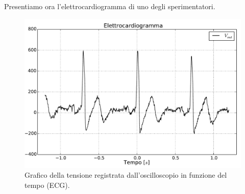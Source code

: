 Presentiamo ora l'elettrocardiogramma di uno degli sperimentatori.

\begin{figure}[htpc]
\centering
\includegraphics[width=.7\textwidth]{../E07/latex/g4.pdf}
\caption{Grafico della tensione registrata dall'oscilloscopio in funzione del tempo (ECG).}
\label{cir8:compensation}
\end{figure}